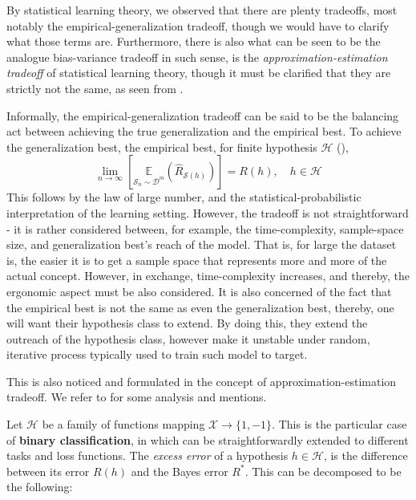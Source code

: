 \documentclass[10pt]{article} %
\begin{document}
By statistical learning theory, we observed that there are plenty tradeoffs, most notably the empirical-generalization tradeoff, though we would have to clarify what those terms are. Furthermore, there is also what can be seen to be the analogue bias-variance tradeoff in such sense, is the \textit{approximation-estimation tradeoff} of statistical learning theory, though it must be clarified that they are strictly not the same, as seen from \cite{brown2024biasvariance}. 

Informally, the empirical-generalization tradeoff can be said to be the balancing act between achieving the true generalization and the empirical best. To achieve the generalization best, the empirical best, for finite hypothesis $\mathcal{H}$ (\cite{10.5555/2371238}), 
\begin{equation}
  \lim_{n\to \infty} \left[\underset{\mathcal{S}_{n}\sim \mathcal{D}^{m}}{\mathbb{E}}(\hat{R}_{\mathcal{S}(h)})\right]  = R(h), \quad h\in \mathcal{H}
\end{equation} 
This follows by the law of large number, and the statistical-probabilistic interpretation of the learning setting. However, the tradeoff is not straightforward - it is rather considered between, for example, the time-complexity, sample-space size, and generalization best's reach of the model. That is, for large the dataset is, the easier it is to get a sample space that represents more and more of the actual concept. However, in exchange, time-complexity increases, and thereby, the ergonomic aspect must be also considered. It is also concerned of the fact that the empirical best is not the same as even the generalization best, thereby, one will want their hypothesis class to extend. By doing this, they extend the outreach of the hypothesis class, however make it unstable under random, iterative process typically used to train such model to target. 

This is also noticed and formulated in the concept of approximation-estimation tradeoff. We refer to \cite{10.5555/2371238,lafon_understanding_2024} for some analysis and mentions. 

Let $\mathcal{H}$ be a family of functions mapping $\mathcal{X}\to\{1,-1\}$. This is the particular case of \textbf{binary classification}, in which can be straightforwardly extended to different tasks and loss functions. The \textit{excess error} of a hypothesis $h\in\mathcal{H}$, is the difference between its error $R(h)$ and the Bayes error $R^{*}$. This can be decomposed to be the following: 
\end{document}
